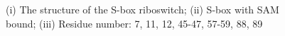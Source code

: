 \documentclass[a4paper,10pt]{article}
\begin{document}
\begin{figure}
\begin{center}
\end{center}
\caption{(i) The structure of the S-box riboswitch; (ii) S-box with SAM bound; (iii) Residue number: 7, 11, 
12, 45-47, 57-59, 88, 89}
\end{figure}
\end{document}
